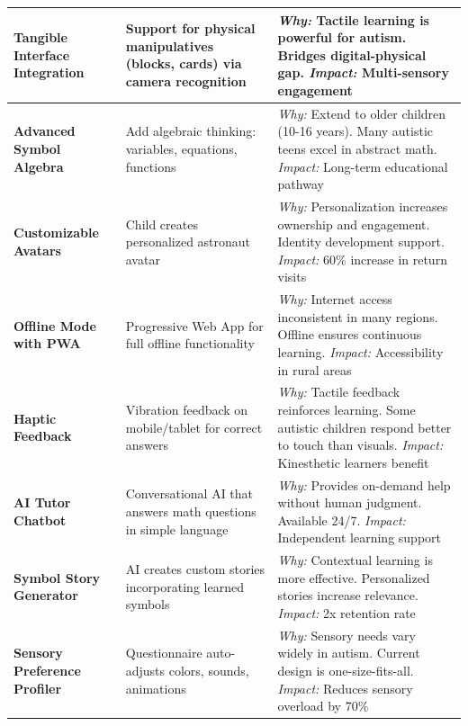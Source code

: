 \documentclass[12pt, a4paper]{article}
\begin{document}
\begin{longtable}{|>{\raggedright}p{4cm}|>{\raggedright}p{5cm}|>{\raggedright\arraybackslash}p{5cm}|}
\textbf{Tangible Interface Integration} & Support for physical manipulatives (blocks, cards) via camera recognition & \textit{Why:} Tactile learning is powerful for autism. Bridges digital-physical gap. \newline \textit{Impact:} Multi-sensory engagement \\
\hline

\textbf{Advanced Symbol Algebra} & Add algebraic thinking: variables, equations, functions & \textit{Why:} Extend to older children (10-16 years). Many autistic teens excel in abstract math. \newline \textit{Impact:} Long-term educational pathway \\
\hline

\textbf{Customizable Avatars} & Child creates personalized astronaut avatar & \textit{Why:} Personalization increases ownership and engagement. Identity development support. \newline \textit{Impact:} 60\% increase in return visits \\
\hline

\textbf{Offline Mode with PWA} & Progressive Web App for full offline functionality & \textit{Why:} Internet access inconsistent in many regions. Offline ensures continuous learning. \newline \textit{Impact:} Accessibility in rural areas \\
\hline

\textbf{Haptic Feedback} & Vibration feedback on mobile/tablet for correct answers & \textit{Why:} Tactile feedback reinforces learning. Some autistic children respond better to touch than visuals. \newline \textit{Impact:} Kinesthetic learners benefit \\
\hline

\textbf{AI Tutor Chatbot} & Conversational AI that answers math questions in simple language & \textit{Why:} Provides on-demand help without human judgment. Available 24/7. \newline \textit{Impact:} Independent learning support \\
\hline

\textbf{Symbol Story Generator} & AI creates custom stories incorporating learned symbols & \textit{Why:} Contextual learning is more effective. Personalized stories increase relevance. \newline \textit{Impact:} 2x retention rate \\
\hline

\textbf{Sensory Preference Profiler} & Questionnaire auto-adjusts colors, sounds, animations & \textit{Why:} Sensory needs vary widely in autism. Current design is one-size-fits-all. \newline \textit{Impact:} Reduces sensory overload by 70\% \\
\hline


\end{longtable}
\end{document}
